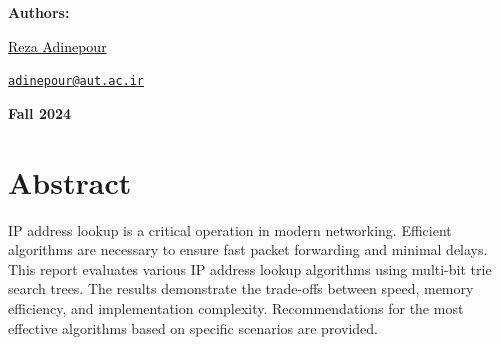 \documentclass[12pt	]{article}
\begin{document}
\begin{flushleft}
    \textbf{\selectfont Authors:}
\end{flushleft}

\begin{center}
    \begin{minipage}{0.5\textwidth}
        \begin{flushleft}
            \href{https://rezaadinepour.github.io/}{\textcolor{black}{Reza Adinepour}}\\
        \end{flushleft}
    \end{minipage}%
    \begin{minipage}{0.5\textwidth}
        \begin{flushright}
            \href{mailto:adinepour@aut.ac.ir}{\texttt{adinepour@aut.ac.ir}}
        \end{flushright}
    \end{minipage}
\end{center}

\vspace{1em}

    
\begin{center}
    \bigskip \bigskip \bigskip \bigskip
    \large \bf {}\selectfont Fall 2024
\end{center}

\thispagestyle{empty}

\setcounter{page}{0}

\newpage

\tableofcontents

\newpage






\section{Abstract}
IP address lookup is a critical operation in modern networking. Efficient algorithms are necessary to ensure fast packet forwarding and minimal delays. This report evaluates various IP address lookup algorithms using multi-bit trie search trees. The results demonstrate the trade-offs between speed, memory efficiency, and implementation complexity. Recommendations for the most effective algorithms based on specific scenarios are provided.
\end{document}
